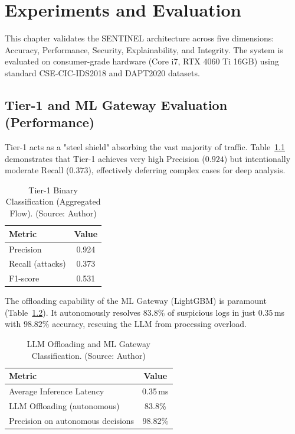 \chapter{Experiments and Evaluation}
\label{ch:experiments_evaluation}

This chapter validates the SENTINEL architecture across five dimensions: Accuracy, Performance, Security, Explainability, and Integrity. The system is evaluated on consumer-grade hardware (Core i7, RTX 4060 Ti 16GB) using standard CSE-CIC-IDS2018 and DAPT2020 datasets.

\section{Tier-1 and ML Gateway Evaluation (Performance)}
Tier-1 acts as a "steel shield" absorbing the vast majority of traffic. Table~\ref{tab:classification} demonstrates that Tier-1 achieves very high Precision ($0.924$) but intentionally moderate Recall ($0.373$), effectively deferring complex cases for deep analysis.

\begin{table}[!htbp]
    \centering
    \caption{Tier-1 Binary Classification (Aggregated Flow). (Source: Author)}
    \label{tab:classification}
    \begin{tabular}{|l|c|}
        \hline
        \textbf{Metric} & \textbf{Value} \\ \hline
        Precision & 0.924 \\ \hline
        Recall (attacks) & 0.373 \\ \hline
        F1-score & 0.531 \\ \hline
    \end{tabular}
\end{table}

The offloading capability of the ML Gateway (LightGBM) is paramount (Table~\ref{tab:mlgate}). It autonomously resolves $83.8\%$ of suspicious logs in just $0.35$\,ms with $98.82\%$ accuracy, rescuing the LLM from processing overload.

\begin{table}[!htbp]
    \centering
    \caption{LLM Offloading and ML Gateway Classification. (Source: Author)}
    \label{tab:mlgate}
    \begin{tabular}{|l|c|}
        \hline
        \textbf{Metric} & \textbf{Value} \\ \hline
        Average Inference Latency & 0.35\,ms \\ \hline
        LLM Offloading (autonomous) & 83.8\% \\ \hline
        Precision on autonomous decisions & 98.82\% \\ \hline
    \end{tabular}
\end{table}

